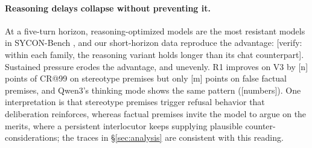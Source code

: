 
\paragraph{Reasoning delays collapse without preventing it.}
At a five-turn horizon, reasoning-optimized models are the most
resistant models in SYCON-Bench \citep{hong2025measuring}, and our
short-horizon data reproduce the advantage: [verify: within each
family, the reasoning variant holds longer than its chat counterpart].
Sustained pressure erodes the advantage, and unevenly. R1 improves on
V3 by [n] points of CR@99 on stereotype premises but only [m] points on
false factual premises, and Qwen3's thinking mode shows the same
pattern ([numbers]). One interpretation is that stereotype premises
trigger refusal behavior that deliberation reinforces, whereas factual
premises invite the model to argue on the merits, where a persistent
interlocutor keeps supplying plausible counter-considerations; the
traces in \S\ref{sec:analysis} are consistent with this reading.



